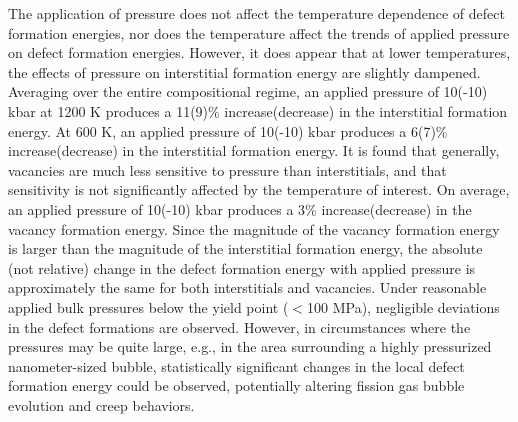 \documentclass[default]{sn-jnl}%
\begin{document}
The application of pressure does not affect the temperature dependence of defect formation energies, nor does the temperature affect the trends of applied pressure on defect formation energies. However, it does appear that at lower temperatures, the effects of pressure on interstitial formation energy are slightly dampened. Averaging over the entire compositional regime, an applied pressure of 10(-10) kbar at 1200 K produces a 11(9)\% increase(decrease) in the interstitial formation energy. At 600 K, an applied pressure of 10(-10) kbar produces a 6(7)\% increase(decrease) in the interstitial formation energy. It is found that generally, vacancies are much less sensitive to pressure than interstitials, and that sensitivity is not significantly affected by the temperature of interest. On average, an applied pressure of 10(-10) kbar produces a 3\% increase(decrease) in the vacancy formation energy. Since the magnitude of the vacancy formation energy is larger than the magnitude of the interstitial formation energy, the absolute (not relative) change in the defect formation energy with applied pressure is approximately the same for both interstitials and vacancies. Under reasonable applied bulk pressures below the yield point ($<$100 MPa), negligible deviations in the defect formations are observed. However, in circumstances where the pressures may be quite large, e.g., in the area surrounding a highly pressurized nanometer-sized bubble, statistically significant changes in the local defect formation energy could be observed, potentially altering fission gas bubble evolution and creep behaviors.
\end{document}
